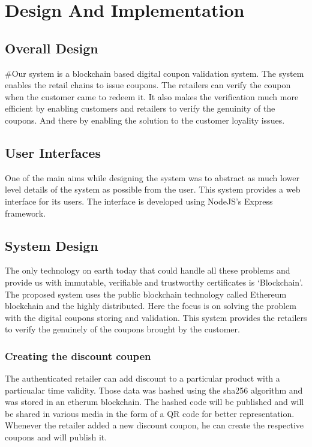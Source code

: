 \chapter{Design And Implementation}

\section{Overall Design}
\par
#Our system is a blockchain based digital coupon validation system. The system
enables the retail chains to issue coupons. The retailers can verify the coupon
when the customer came to redeem it. It also makes the verification much more
efficient by enabling customers and retailers to verify the genuinity of the coupons. And there by enabling the solution to the customer loyality issues.

\section{User Interfaces}
One of the main aims while designing the
system was to abstract as much lower level details of the system as possible
from the user. This system provides a web interface for its users. The interface is developed using NodeJS's Express framework.

\section{System Design}
\par
The only technology on earth today that could handle all these problems and provide us with immutable, verifiable and trustworthy certificates is ‘Blockchain’. The proposed system uses the public blockchain technology called Ethereum blockchain and the highly distributed. Here the focus is on solving the problem with the digital coupons storing and validation. This system provides the retailers to verify the genuinely of the coupons brought by the customer.
\subsection{Creating the discount coupen}
The authenticated retailer can add discount to a particular product with a particualar time validity. Those data was hashed using the sha256 algorithm and was stored in an etherum blockchain.
The hashed code will be published and will be shared in various media in the form of a QR code for better representation. Whenever the retailer added a new discount coupon, he can create the respective coupons and will publish it. 

